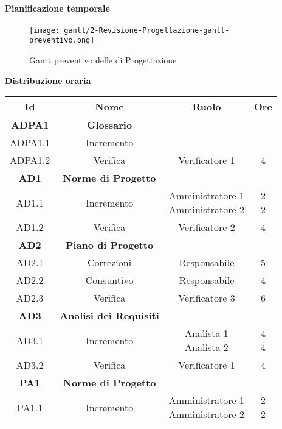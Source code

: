 \documentclass{scalatekids-article}
\begin{document}
\newpage
\paragraph{Pianificazione temporale}
\begin{figure}[H]
  \texttt{[image: gantt/2-Revisione-Progettazione-gantt-preventivo.png]}
  \caption{Gantt preventivo delle  di Progettazione}
\end{figure}

\newpage
\textbf{Distribuzione oraria}
\scriptsize
\begin{center}
  \begin{tabular}{| c | c | c | c |}
    \hline
    \textbf{Id} & \textbf{Nome} & \textbf{Ruolo} & \textbf{Ore}\\
    \hline
    \textbf{ADPA1} & \textbf{Glossario} & &\\
    \hline
    ADPA1.1 & Incremento &  &\\
    \hline
    ADPA1.2 & Verifica & Verificatore 1 & 4\\
    \hline
    \textbf{AD1} & \textbf{Norme di Progetto} & &\\
    \hline
    AD1.1 & Incremento & \multiLineCell[t]{Amministratore 1\\Amministratore 2} & \multiLineCell[t]{2\\2}\\
    \hline
    AD1.2 & Verifica & Verificatore 2 & 4\\
    \hline
    \textbf{AD2} & \textbf{Piano di Progetto} & &\\
    \hline
    AD2.1 & Correzioni & Responsabile & 5\\
    \hline
    AD2.2 & Consuntivo & Responsabile & 4\\
    \hline
    AD2.3 & Verifica & Verificatore 3 & 6\\
    \hline
    \textbf{AD3} & \textbf{Analisi dei Requisiti} & &\\
    \hline
    AD3.1 & Incremento & \multiLineCell[t]{Analista 1\\Analista 2} & \multiLineCell[t]{4\\4}\\
    \hline
    AD3.2 & Verifica & Verificatore 1 & 4\\
    \hline
    \textbf{PA1} & \textbf{Norme di Progetto} & &\\
    \hline
    PA1.1 & Incremento & \multiLineCell[t]{Amministratore 1\\Amministratore 2} & \multiLineCell[t]{2\\2}\\

\end{tabular}
\end{center}
\end{document}
